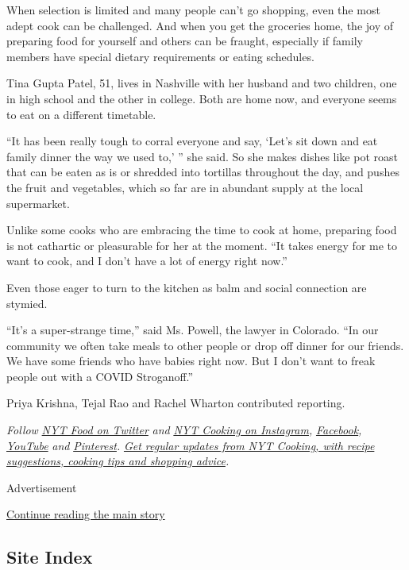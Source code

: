 When selection is limited and many people can't go shopping, even the
most adept cook can be challenged. And when you get the groceries home,
the joy of preparing food for yourself and others can be fraught,
especially if family members have special dietary requirements or eating
schedules.

Tina Gupta Patel, 51, lives in Nashville with her husband and two
children, one in high school and the other in college. Both are home
now, and everyone seems to eat on a different timetable.

``It has been really tough to corral everyone and say, `Let's sit down
and eat family dinner the way we used to,' '' she said. So she makes
dishes like pot roast that can be eaten as is or shredded into tortillas
throughout the day, and pushes the fruit and vegetables, which so far
are in abundant supply at the local supermarket.

Unlike some cooks who are embracing the time to cook at home, preparing
food is not cathartic or pleasurable for her at the moment. ``It takes
energy for me to want to cook, and I don't have a lot of energy right
now.''

Even those eager to turn to the kitchen as balm and social connection
are stymied.

``It's a super-strange time,'' said Ms. Powell, the lawyer in Colorado.
``In our community we often take meals to other people or drop off
dinner for our friends. We have some friends who have babies right now.
But I don't want to freak people out with a COVID Stroganoff.''

Priya Krishna, Tejal Rao and Rachel Wharton contributed reporting.

\emph{Follow} \href{https://twitter.com/nytfood}{\emph{NYT Food on
Twitter}} \emph{and}
\href{https://www.instagram.com/nytcooking/}{\emph{NYT Cooking on
Instagram}}\emph{,}
\href{https://www.facebookcorewwwi.onion/nytcooking/}{\emph{Facebook}}\emph{,}
\href{https://www.youtube.com/nytcooking}{\emph{YouTube}} \emph{and}
\href{https://www.pinterest.com/nytcooking/}{\emph{Pinterest}}\emph{.}
\href{https://www.nytimes3xbfgragh.onion/newsletters/cooking}{\emph{Get
regular updates from NYT Cooking, with recipe suggestions, cooking tips
and shopping advice}}\emph{.}

Advertisement

\protect\hyperlink{after-bottom}{Continue reading the main story}

\hypertarget{site-index}{%
\subsection{Site Index}\label{site-index}}

